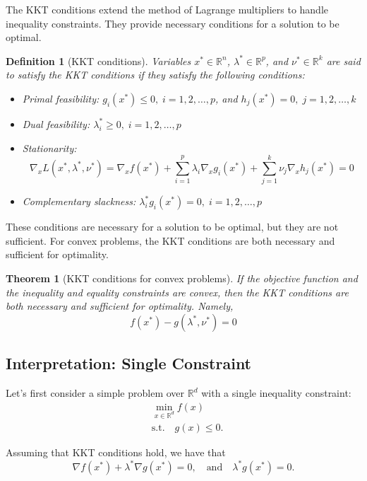 \documentclass[11pt]{book} %
\newtheorem{theorem}{Theorem}[section]
\newtheorem{definition}{Definition}[section]
\begin{document}
The KKT conditions extend the method of Lagrange multipliers to handle inequality constraints. 
They provide necessary conditions for a solution to be optimal. 
\begin{definition}[KKT conditions]

Variables \(x^* \in \mathbb{R}^n\), \(\lambda^* \in \mathbb{R}^p\), and \(\nu^* \in \mathbb{R}^k\) are said to satisfy the KKT conditions if they satisfy the following conditions:
\begin{itemize}
    \item Primal feasibility: \(g_i(x^*) \leq 0, \; i = 1, 2, \ldots, p\), and \(h_j(x^*) = 0, \; j = 1, 2, \ldots, k\)
    \item Dual feasibility: \(\lambda_i^* \geq 0, \; i = 1, 2, \ldots, p\)
    \item Stationarity: 
    \[ 
    \nabla_x L(x^*, \lambda^*, \nu^*) = \nabla_x f(x^*) + \sum_{i=1}^{p} \lambda_i \nabla_x g_i(x^*) + \sum_{j=1}^{k} \nu_j \nabla_x h_j(x^*) = 0
    \]
    \item Complementary slackness: \(\lambda_i^* g_i(x^*) = 0, \; i = 1, 2, \ldots, p\)
\end{itemize}
\end{definition}

These conditions are necessary for a solution to be optimal, but they are not sufficient.
For convex problems, the KKT conditions are both necessary and sufficient for optimality.

\begin{theorem}[KKT conditions for convex problems]
If the objective function and the inequality and equality constraints are convex, then the KKT conditions are both necessary and sufficient for optimality.
Namely, 
\[
  f(x^*) - g(\lambda^*, \nu^*) = 0  
\]
\end{theorem}

\subsection{Interpretation: Single Constraint}

Let's first consider a simple problem over $\mathbb{R}^d$ with a single inequality constraint:
\begin{align*}
    & \min_{x \in \mathbb{R}^d} f(x) \\
    & \text{s.t.} \quad g(x) \leq 0.
\end{align*}

Assuming that KKT conditions hold, we have that
\[
    \nabla f(x^*) + \lambda^* \nabla g(x^*) = 0, \quad \text{and} \quad \lambda^* g(x^*) = 0.
\]
\end{document}

